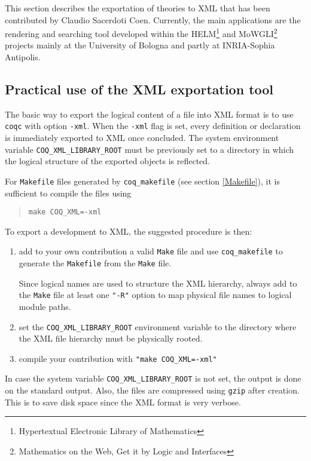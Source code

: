 \label{Helm}

This section describes the exportation of {\Coq} theories to XML that
has been contributed by Claudio Sacerdoti Coen.  Currently, the main
applications are the rendering and searching tool
developed within the HELM\footnote{Hypertextual Electronic Library of
Mathematics} and MoWGLI\footnote{Mathematics on the Web, Get it by
Logic and Interfaces} projects mainly at the University of Bologna and
partly at INRIA-Sophia Antipolis.

\subsection{Practical use of the XML exportation tool}

The basic way to export the logical content of a file into XML format
is to use {\tt coqc} with option {\tt -xml}. 
When the {\tt -xml} flag is set, every definition or declaration is
immediately exported to XML once concluded.
The system environment variable {\tt COQ\_XML\_LIBRARY\_ROOT} must be
previously set to a directory in which the logical structure of the
exported objects is reflected.

  For {\tt Makefile} files generated by \verb+coq_makefile+ (see section
  \ref{Makefile}), it is sufficient to compile the files using
 \begin{quotation}
   \verb+make COQ_XML=-xml+
 \end{quotation}
 
 To export a development to XML, the suggested procedure is then:
 
 \begin{enumerate}
  \item add to your own contribution a valid \verb+Make+ file and use
      \verb+coq_makefile+ to generate the \verb+Makefile+ from the \verb+Make+
      file.
 
      \Warning Since logical names are used to structure the XML
      hierarchy, always add to the \verb+Make+ file at least one \verb+"-R"+
      option to map physical file names to logical module paths.
  \item set the \verb+COQ_XML_LIBRARY_ROOT+ environment variable to
  the directory where the XML file hierarchy must be physically
  rooted.
  \item compile your contribution with \verb+"make COQ_XML=-xml"+
 \end{enumerate}
 
\Rem In case the system variable {\tt COQ\_XML\_LIBRARY\_ROOT} is not set,
the output is done on the standard output. Also, the files are
compressed using {\tt gzip} after creation. This is to save disk space
since the XML format is very verbose.

